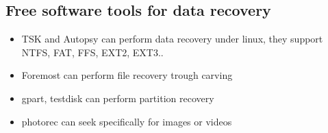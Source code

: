         \subsection{Free software tools for data recovery}
            \begin{itemize}
                \item TSK and Autopsy can perform data recovery under linux, they support NTFS, FAT, FFS, EXT2, EXT3..
                \item Foremost can perform file recovery trough carving
                \item gpart, testdisk can perform partition recovery
                \item photorec can seek specifically for images or videos
            \end{itemize}